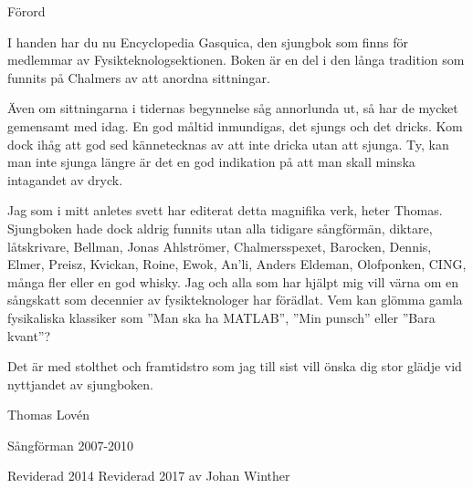 \begin{flushleft}
{\Huge Förord\\}
\end{flushleft}

{\large
I handen har du nu Encyclopedia Gasquica, den sjungbok som finns för medlemmar av Fysikteknologsektionen. Boken är en del i den långa tradition som funnits på 
Chalmers av att anordna sittningar.

Även om sittningarna i tidernas begynnelse såg annorlunda ut, så har de mycket gemensamt med idag. En god måltid
inmundigas, det sjungs och det dricks. Kom dock ihåg att god sed kännetecknas av att inte dricka utan att sjunga. Ty, kan man inte sjunga längre är det en god indikation på att man skall minska intagandet av dryck.

Jag som i mitt anletes svett har editerat detta magnifika verk, heter Thomas. Sjungboken hade dock aldrig funnits utan alla tidigare sångförmän,
diktare, låtskrivare, Bellman, Jonas Ahlströmer, Chalmersspexet, Barocken,
Dennis, Elmer, Preisz, Kvickan, Roine, Ewok, An'li, Anders Eldeman, Olofponken, CING, många fler eller en god whisky.
Jag och alla som har hjälpt mig vill värna om en sångskatt som decennier av fysikteknologer har förädlat.
Vem kan glömma gamla fysikaliska klassiker som ''Man ska ha MATLAB'', ''Min punsch'' eller ''Bara kvant''?

Det är med stolthet och framtidstro som jag till sist vill önska dig stor glädje vid nyttjandet av sjungboken.

\vspace{0.5cm}
\begin{flushright}
Thomas Lovén

Sångförman 2007-2010

Reviderad 2014
Reviderad 2017 av Johan Winther
\end{flushright}
}


\newpage

